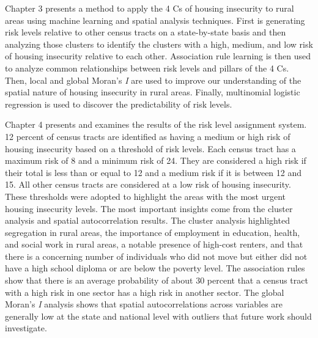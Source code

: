 Chapter 3 presents a method to apply the 4 Cs of housing insecurity to rural areas using machine learning and spatial analysis techniques. First is generating risk levels relative to other census tracts on a state-by-state basis and then analyzing those clusters to identify the clusters with a high, medium, and low risk of housing insecurity relative to each other. Association rule learning is then used to analyze common relationships between risk levels and pillars of the 4 Cs. Then, local and global Moran's \textit{I} are used to improve our understanding of the spatial nature of housing insecurity in rural areas. Finally, multinomial logistic regression is used to discover the predictability of risk levels. 

Chapter 4 presents and examines the results of the risk level assignment system. 12 percent of census tracts are identified as having a medium or high risk of housing insecurity based on a threshold of risk levels. Each census tract has a maximum risk of 8 and a minimum risk of 24. They are considered a high risk if their total is less than or equal to 12 and a medium risk if it is between 12 and 15. All other census tracts are considered at a low risk of housing insecurity. These thresholds were adopted to highlight the areas with the most urgent housing insecurity levels. The most important insights come from the cluster analysis and spatial autocorrelation results. The cluster analysis highlighted segregation in rural areas, the importance of employment in education, health, and social work in rural areas, a notable presence of high-cost renters, and that there is a concerning number of individuals who did not move but either did not have a high school diploma or are below the poverty level. The association rules show that there is an average probability of about 30 percent that a census tract with a high risk in one sector has a high risk in another sector. The global Moran's \textit{I} analysis shows that spatial autocorrelations across variables are generally low at the state and national level with outliers that future work should investigate. 

